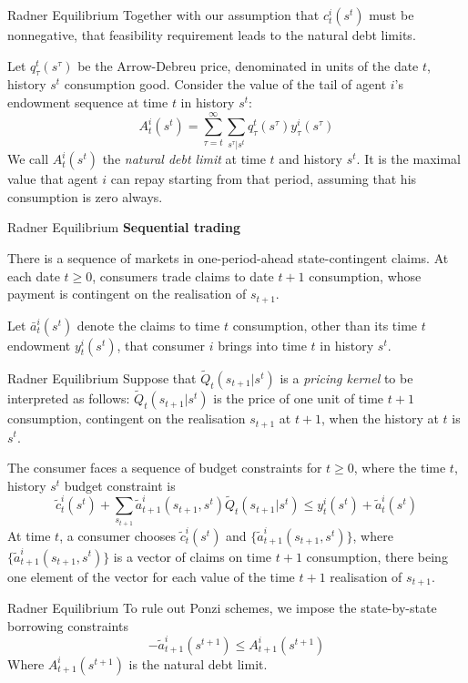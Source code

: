 \documentclass[aspectratio=169,xcolor=dvipsnames]{beamer}
\begin{document}
\begin{frame}{Radner Equilibrium}
    Together with our assumption that $c^i_t(s^t)$ must be nonnegative, that feasibility requirement leads to the natural debt limits.

    Let $q^t_\tau(s^\tau)$ be the Arrow-Debreu price, denominated in units of the date $t$, history $s^t$ consumption good. Consider the value of the tail of agent $i$'s endowment sequence at time $t$ in history $s^t$:
    \[
        A^i_t(s^t) = \sum_{\tau=t}^\infty \sum_{s^\tau | s^t} q^t_\tau(s^\tau) y^i_\tau(s^\tau)
    \]
    We call $A^i_t(s^t)$ the \emph{natural debt limit} at time $t$ and history $s^t$. It is the maximal value that agent $i$ can repay starting from that period, assuming that his consumption is zero always.
\end{frame}

\begin{frame}{Radner Equilibrium}
    \textbf{Sequential trading}

    There is a sequence of markets in one-period-ahead state-contingent claims. At each date $t \ge 0$, consumers trade claims to date $t+1$ consumption, whose payment is contingent on the realisation of $s_{t+1}$.

    Let $\bar a^i_t(s^t)$ denote the claims to time $t$ consumption, other than its time $t$ endowment $y^i_t(s^t)$, that consumer $i$ brings into time $t$ in history $s^t$.
\end{frame}

\begin{frame}{Radner Equilibrium}
    Suppose that $\tilde Q_t(s_{t+1} | s^t)$ is a \emph{pricing kernel} to be interpreted as follows: $\tilde Q_t(s_{t+1} | s^t)$ is the price of one unit of time $t+1$ consumption, contingent on the realisation $s_{t+1}$ at $t+1$, when the history at $t$ is $s^t$.

    The consumer faces a sequence of budget constraints for $t \ge 0$, where the time $t$, history $s^t$ budget constraint is
    \[
        \tilde c^i_t(s^t) + \sum_{s_{t+1}} \tilde a^i_{t+1}(s_{t+1}, s^t) \tilde Q_t(s_{t+1} | s^t) \le y^i_t(s^t) + \tilde a^i_t(s^t)
    \]
    At time $t$, a consumer chooses $\tilde c^i_t(s^t)$ and $\{\tilde a^i_{t+1}(s_{t+1}, s^t)\}$, where $\{\tilde a^i_{t+1}(s_{t+1}, s^t)\}$ is a vector of claims on time $t+1$ consumption, there being one element of the vector for each value of the time $t+1$ realisation of $s_{t+1}$.
\end{frame}

\begin{frame}{Radner Equilibrium}
    To rule out Ponzi schemes, we impose the state-by-state borrowing constraints
    \[
        -\tilde a^i_{t+1}(s^{t+1}) \le A^i_{t+1}(s^{t+1})
    \]
    Where $A^i_{t+1}(s^{t+1})$ is the natural debt limit.
\end{frame}
\end{document}
